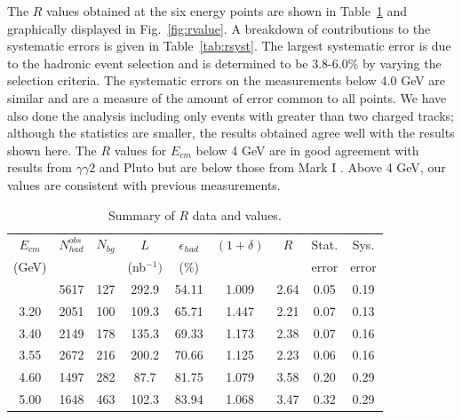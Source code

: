
The $R$ values obtained at the six energy points are shown in
Table~\ref{tab:rvalue} and graphically displayed in
Fig.~\ref{fig:rvalue}.  A breakdown of contributions to the
systematic errors is given in Table~\ref{tab:rsyst}. The largest 
systematic error is due to the hadronic event selection
and is determined to be 3.8-6.0\% by varying the selection criteria.
The systematic
errors on the measurements below 4.0 GeV are similar and are a measure
of the amount of error common to all points.  We have also
done the analysis including only events with greater than two
charged tracks; although the statistics are smaller, the results
obtained agree well with the
results shown here. 
The $R$ values for $E_{cm}$ below 4 GeV are in good agreement with
results from
$\gamma \gamma 2$ \cite{gamma2} and Pluto \cite{pluto} but are below
those from Mark I \cite{MarkI}.
Above 4 GeV,
our values are consistent with previous measurements.

\begin{table}[!h]
\caption{Summary of $R$ data and values.}

\begin{tabular}{ccccccccc}
$E_{cm}$ & $N_{had}^{obs}$ & $N_{bg}$ & $L$  &
$\epsilon_{had}$ & $(1+\delta)$ & $R$  &
Stat.  & Sys.  \\
(GeV)  & & & (nb$^{-1})$ & (\%) & &  & error & error \\
\tableline
2.60 & 5617 & 127 & 292.9 & 54.11 & 1.009 & 2.64 & 0.05 & 0.19 \\
3.20 & 2051 & 100 & 109.3 & 65.71 & 1.447 & 2.21 & 0.07 & 0.13 \\
3.40 & 2149 & 178 & 135.3 & 69.33 & 1.173 & 2.38 & 0.07 & 0.16 \\
3.55 & 2672 & 216 & 200.2 & 70.66 & 1.125 & 2.23 & 0.06 & 0.16 \\
4.60 & 1497 & 282 &  87.7 & 81.75 & 1.079 & 3.58 & 0.20 & 0.29 \\
5.00 & 1648 & 463 & 102.3 & 83.94 & 1.068 & 3.47 & 0.32 & 0.29 \\
\end{tabular}
\label{tab:rvalue}
\end{table}


